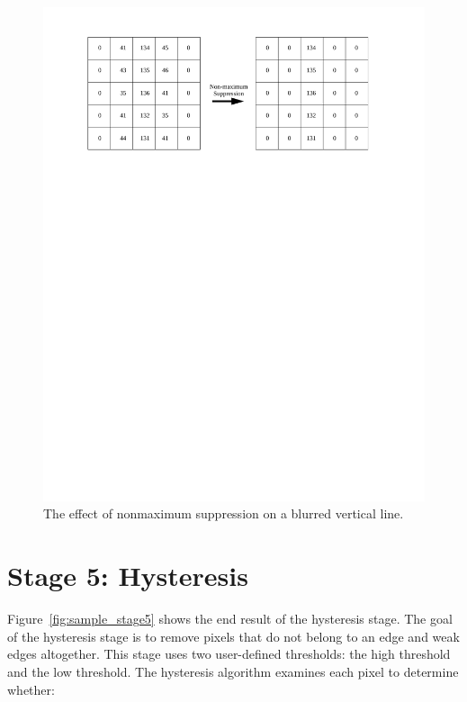 \documentclass[epsfig,10pt,fullpage]{article}
\begin{document}
\begin{figure}[H]
   \begin{center}
       \includegraphics[scale = 0.8]{figures/fig_nonmaximum_suppression.pdf}
   \end{center}
   \caption{The effect of nonmaximum suppression on a blurred vertical line.}
	\label{fig:nonmaximum_suppression}
\end{figure}

\noindent
\section*{Stage 5: Hysteresis}

Figure~\ref{fig:sample_stage5} shows the end result of the hysteresis stage. The goal of the hysteresis stage is to remove pixels that do not belong to an edge and weak edges altogether. This stage uses two user-defined thresholds: the high threshold and the low threshold. The hysteresis algorithm examines each pixel to determine whether: 
\end{document}
